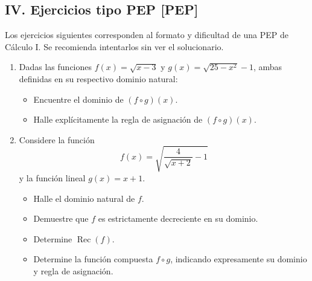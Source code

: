 \documentclass[letterpaper, 12pt]{article}
\newcommand{\nivelpep}{\textcolor{rojoAlerta}{\textbf{[PEP]}}}
\begin{document}
\vspace{0.5cm}\newpage

\subsection*{IV.\; Ejercicios tipo PEP \nivelpep}

\begin{tcolorbox}[colback=rojoAlerta!8, colframe=rojoAlerta, arc=6pt,
    boxrule=0.8pt, left=4pt, right=4pt, top=3pt, bottom=3pt]
    \small\color{black}
    Los ejercicios siguientes corresponden al formato y dificultad de una PEP
    de Cálculo I. Se recomienda intentarlos sin ver el solucionario.
\end{tcolorbox}

\vspace{0.4cm}

\begin{enumerate}[label=\color{azulFuerte}\bfseries\arabic*., leftmargin=*, itemsep=1.6em, start=14]

\item Dadas las funciones $f(x)=\sqrt{x-3}$ y $g(x)=\sqrt{25-x^{2}}-1$,
    ambas definidas en su respectivo dominio natural:
\begin{itemize}
    \item Encuentre el dominio de $(f\circ g)(x)$.
    \item Halle explícitamente la regla de asignación de $(f\circ g)(x)$.
\end{itemize}

\item Considere la función
\[
    f(x) = \sqrt{\frac{4}{\sqrt{x+2}}-1}
\]
y la función lineal $g(x)=x+1$.
\begin{itemize}
    \item Halle el dominio natural de $f$.
    \item Demuestre que $f$ es estrictamente decreciente en su dominio.
    \item Determine $\operatorname{Rec}(f)$.
    \item Determine la función compuesta $f\circ g$, indicando expresamente
          su dominio y regla de asignación.
\end{itemize}

\end{enumerate}
\end{document}
